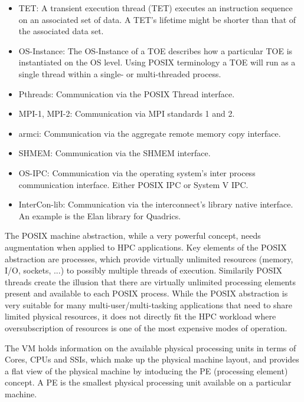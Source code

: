 \begin{itemize}
\item TET: A transient execution thread (TET) executes an instruction sequence on an associated set of data. A TET's lifetime might be shorter than that of the associated data set.

\item OS-Instance: The OS-Instance of a TOE describes how a particular TOE is instantiated on the OS level. Using POSIX terminology a TOE will run as a single thread within a single- or multi-threaded process.

\item Pthreads: Communication via the POSIX Thread interface.

\item MPI-1, MPI-2: Communication via MPI standards 1 and 2.

\item armci: Communication via the aggregate remote memory copy interface.

\item SHMEM: Communication via the SHMEM interface.

\item OS-IPC: Communication via the operating system's inter process communication interface. Either POSIX IPC or System V IPC.

\item InterCon-lib: Communication via the interconnect's library native interface. An example is the Elan library for Quadrics.

\end{itemize}

The POSIX machine abstraction, while a very powerful concept, needs augmentation when applied to HPC applications. Key elements of the POSIX abstraction are processes, which provide virtually unlimited resources (memory, I/O, sockets, ...) to possibly multiple threads of execution. Similarily POSIX threads create the illusion that there are virtually unlimited processing elements present and available to each POSIX process. While the POSIX abstraction is very suitable for many multi-user/multi-tasking applications that need to share limited physical resources, it does not directly fit the HPC workload where oversubscription of resources is one of the most expensive modes of operation.

The VM holds information on the available physical processing units in terms of Cores, CPUs and SSIs, which make up the physical machine layout, and provides a flat view of the physical machine by intoducing the PE (processing element) concept. A PE is the smallest physical processing unit available on a particular machine.

